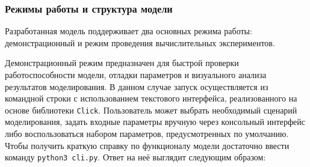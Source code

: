 \documentclass[12pt]{article}
\theoremstyle{definition}
\begin{document}
\subsubsection{Режимы работы и структура модели}

Разработанная модель поддерживает два основных режима работы: демонстрационный и режим проведения вычислительных экспериментов.

Демонстрационный режим предназначен для быстрой проверки работоспособности модели, отладки параметров и визуального анализа результатов моделирования. В данном случае запуск осуществляется из командной строки с использованием текстового интерфейса, реализованного на основе библиотеки \texttt{Click}. Пользователь может выбрать необходимый сценарий моделирования, задать входные параметры вручную через консольный интерфейс либо воспользоваться набором параметров, предусмотренных по умолчанию. Чтобы получить краткую справку по функционалу модели достаточно ввести команду \texttt{python3 cli.py}. Ответ на неё выглядит следующим образом:
\end{document}
